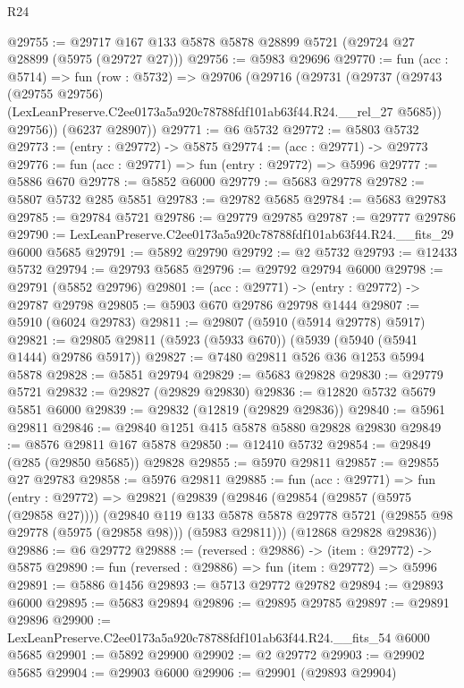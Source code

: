 \begin{lexlean}{R24}
\begin{coremodule}
@29755 := @29717 @167 @133 @5878 @5878 @28899 @5721 (@29724 @27 @28899 (@5975 (@29727 @27)))
@29756 := @5983 @29696
@29770 := fun (acc : @5714) =>
  fun (row : @5732) =>
  @29706
    (@29716
      (@29731
        (@29737
          (@29743
            (@29755 @29756)
            (LexLeanPreserve.C2ee0173a5a920c78788fdf101ab63f44.R24.__rel_27 @5685))
          @29756))
      (@6237 @28907))
@29771 := @6 @5732
@29772 := @5803 @5732
@29773 := (entry : @29772) -> @5875
@29774 := (acc : @29771) -> @29773
@29776 := fun (acc : @29771) => fun (entry : @29772) => @5996
@29777 := @5886 @670
@29778 := @5852 @6000
@29779 := @5683 @29778
@29782 := @5807 @5732 @285 @5851
@29783 := @29782 @5685
@29784 := @5683 @29783
@29785 := @29784 @5721
@29786 := @29779 @29785
@29787 := @29777 @29786
@29790 := LexLeanPreserve.C2ee0173a5a920c78788fdf101ab63f44.R24.__fits_29 @6000 @5685
@29791 := @5892 @29790
@29792 := @2 @5732
@29793 := @12433 @5732
@29794 := @29793 @5685
@29796 := @29792 @29794 @6000
@29798 := @29791 (@5852 @29796)
@29801 := (acc : @29771) -> (entry : @29772) -> @29787 @29798
@29805 := @5903 @670 @29786 @29798 @1444
@29807 := @5910 (@6024 @29783)
@29811 := @29807 (@5910 (@5914 @29778) @5917)
@29821 := @29805 @29811 (@5923 (@5933 @670)) (@5939 (@5940 (@5941 @1444) @29786 @5917))
@29827 := @7480 @29811 @526 @36 @1253 @5994 @5878
@29828 := @5851 @29794
@29829 := @5683 @29828
@29830 := @29779 @5721
@29832 := @29827 (@29829 @29830)
@29836 := @12820 @5732 @5679 @5851 @6000
@29839 := @29832 (@12819 (@29829 @29836))
@29840 := @5961 @29811
@29846 := @29840 @1251 @415 @5878 @5880 @29828 @29830
@29849 := @8576 @29811 @167 @5878
@29850 := @12410 @5732
@29854 := @29849 (@285 (@29850 @5685)) @29828
@29855 := @5970 @29811
@29857 := @29855 @27 @29783
@29858 := @5976 @29811
@29885 := fun (acc : @29771) =>
  fun (entry : @29772) =>
  @29821
    (@29839
      (@29846
        (@29854 (@29857 (@5975 (@29858 @27))))
        (@29840
          @119
          @133
          @5878
          @5878
          @29778
          @5721
          (@29855 @98 @29778 (@5975 (@29858 @98)))
          (@5983 @29811)))
      (@12868 @29828 @29836))
@29886 := @6 @29772
@29888 := (reversed : @29886) -> (item : @29772) -> @5875
@29890 := fun (reversed : @29886) => fun (item : @29772) => @5996
@29891 := @5886 @1456
@29893 := @5713 @29772 @29782
@29894 := @29893 @6000
@29895 := @5683 @29894
@29896 := @29895 @29785
@29897 := @29891 @29896
@29900 := LexLeanPreserve.C2ee0173a5a920c78788fdf101ab63f44.R24.__fits_54 @6000 @5685
@29901 := @5892 @29900
@29902 := @2 @29772
@29903 := @29902 @5685
@29904 := @29903 @6000
@29906 := @29901 (@29893 @29904)

\end{coremodule}
\end{lexlean}
